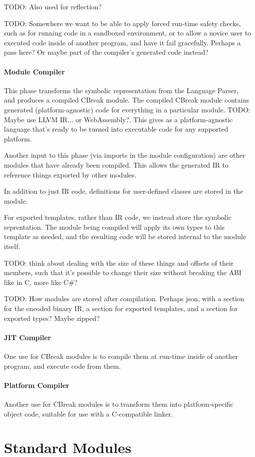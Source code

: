 \documentclass{article}
\newcommand{\breakingparagraph}[1]{\paragraph{#1}\mbox{}\medbreak}
\begin{document}
TODO: Also used for reflection?

TODO: Somewhere we want to be able to apply forced run-time safety checks, such as for running code in a sandboxed environment, or to allow a novice user to executed code inside of another program, and have it fail gracefully.  Perhaps a pass here?  Or maybe part of the compiler's generated code instead?

\breakingparagraph{Module Compiler}

This phase transforms the symbolic representation from the Language Parser, and produces a compiled CBreak module.  The compiled CBreak module contains generated (platform-agnostic) code for everything in a particular module.  TODO: Maybe use LLVM IR... or WebAssembly?.  This gives as a platform-agnostic language that's ready to be turned into executable code for any supported platform.

Another input to this phase (via imports in the module configuration) are other modules that have already been compiled.  This allows the generated IR to reference things exported by other modules.

In addition to just IR code, definitions for user-defined classes are stored in the module.

For exported templates, rather than IR code, we instead store the symbolic reprentation.  The module being compiled will apply its own types to this template as needed, and the resulting code will be stored internal to the module itself.

TODO: think about dealing with the size of these things and offsets of their members, such that it's possible to change their size without breaking the ABI like in C, more like C\#?

TODO: How modules are stored after compilation.  Perhaps json, with a section for the encoded binary IR, a section for exported templates, and a section for exported types?  Maybe zipped?

\breakingparagraph{JIT Compiler}

One use for CBreak modules is to compile them at run-time inside of another program, and execute code from them.

\breakingparagraph{Platform Compiler}

Another use for CBreak modules is to transform them into platform-specific object code, suitable for use with a C-compatible linker.

\newpage

\section{Standard Modules}
\end{document}
